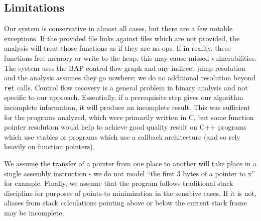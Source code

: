 \subsection{Limitations}
Our system is conservative in almost all cases, but there are a few notable exceptions.
If the provided file links against files which are not provided, the analysis will treat those functions as if they are no-ops.
If in reality, these functions free memory or write to the heap, this may cause missed vulnerabilities.
The system uses the BAP control flow graph and any indirect jump resolution and the analysis assumes they go nowhere; we do no additional resolution beyond \texttt{ret} calls.
Control flow recovery is a general problem in binary analysis and not specific to our approach.
Essentially, if a prerequisite step gives our algorithm incomplete information, it will produce an incomplete result.
This was sufficient for the programs analyzed, which were primarily written in C, but some function pointer resolution would help to achieve good quality result on C++ programs which use vtables or programs which use a callback architecture (and so rely heavily on function pointers).

We assume the transfer of a pointer from one place to another will take place in a single assembly instruction - we do not model ``the first 3 bytes of a pointer to x'' for example.
Finally, we assume that the program follows traditional stack discipline for purposes of points-to minimization in the sensitive cases.
If it is not, aliases from stack calculations pointing above or below the current stack frame may be incomplete.
